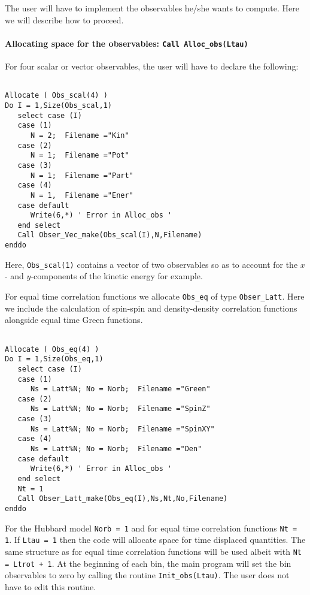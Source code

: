 \documentclass{SciPost}
\begin{document}
The user will have to  implement the  observables  he/she  wants to compute. Here  we  will describe how to  proceed. 
%
\paragraph{Allocating space for the observables: \texttt{Call Alloc\_obs(Ltau) }} \label{Alloc_obs_sec}
%
For  four scalar  or vector observables,  the user will have to  declare the following: 
\begin{lstlisting}

Allocate ( Obs_scal(4) )
Do I = 1,Size(Obs_scal,1)
   select case (I)
   case (1)
      N = 2;  Filename ="Kin"
   case (2)
      N = 1;  Filename ="Pot"
   case (3)
      N = 1;  Filename ="Part"
   case (4)
      N = 1,  Filename ="Ener"
   case default
      Write(6,*) ' Error in Alloc_obs '  
   end select
   Call Obser_Vec_make(Obs_scal(I),N,Filename)
enddo
\end{lstlisting}
Here,   \texttt{Obs\_scal(1)}   contains a vector  of two observables  so as to account for the $x$- and $y$-components of the kinetic energy for example.  

For equal time correlation  functions  we allocate  \texttt{Obs\_eq}  of type \texttt{Obser\_Latt}.  Here we include the calculation of spin-spin and density-density correlation functions alongside equal time Green functions. 
\begin{lstlisting}

Allocate ( Obs_eq(4) )
Do I = 1,Size(Obs_eq,1)
   select case (I)
   case (1)
      Ns = Latt%N; No = Norb;  Filename ="Green"
   case (2)
      Ns = Latt%N; No = Norb;  Filename ="SpinZ"
   case (3)
      Ns = Latt%N; No = Norb;  Filename ="SpinXY"
   case (4)
      Ns = Latt%N; No = Norb;  Filename ="Den"
   case default
      Write(6,*) ' Error in Alloc_obs '  
   end select
   Nt = 1
   Call Obser_Latt_make(Obs_eq(I),Ns,Nt,No,Filename)
enddo
 \end{lstlisting} 
 For the Hubbard model \texttt{Norb = 1} and for   equal time correlation functions   \texttt{Nt = 1}.       If  \texttt{Ltau = 1}  then the code will allocate space for  time displaced quantities.   The same structure as for  equal time correlation functions will be used albeit with  \texttt{Nt = Ltrot + 1}.  At the beginning of each bin, the main program will set the bin observables to zero by calling  the routine 
 \texttt{Init\_obs(Ltau)}.   The user does not have to edit this routine. 
% 
\end{document}
